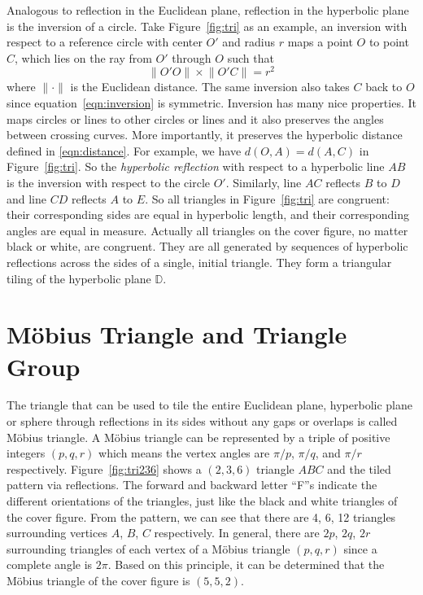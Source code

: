 \documentclass[12pt]{article}
\begin{document}
Analogous to reflection in the Euclidean plane, reflection in the
hyperbolic plane is the inversion of a circle. Take
Figure~\ref{fig:tri} as an example, an inversion with respect to a
reference circle with center $O'$ and radius $r$ maps a point $O$ to
point $C$, which lies on the ray from $O'$ through $O$ such that
\begin{equation}\label{eqn:inversion}
  \lVert O'O \rVert \times \lVert O'C \rVert= r^2
\end{equation}
where $\lVert \cdot \rVert$ is the Euclidean distance. The same
inversion also takes $C$ back to $O$ since
equation~\eqref{eqn:inversion} is symmetric. Inversion has many nice
properties. It maps circles or lines to other circles or lines and it
also preserves the angles between crossing curves. More importantly,
it preserves the hyperbolic distance defined in
\eqref{eqn:distance}. For example, we have $d(O, A)=d(A, C)$ in
Figure~\ref{fig:tri}. So the \emph{hyperbolic reflection} with respect
to a hyperbolic line $AB$ is the inversion with respect to the circle
$O'$. Similarly, line $AC$ reflects $B$ to $D$ and line $CD$ reflects
$A$ to $E$. So all triangles in Figure~\ref{fig:tri} are congruent:
their corresponding sides are equal in hyperbolic length, and their
corresponding angles are equal in measure. Actually all triangles on
the cover figure, no matter black or white, are congruent. They are
all generated by sequences of hyperbolic reflections across the sides
of a single, initial triangle. They form a triangular tiling of the
hyperbolic plane $\mathbb{D}$.

\section{M\"obius Triangle and Triangle Group}

The triangle that can be used to tile the entire Euclidean plane,
hyperbolic plane or sphere through reflections in its sides without
any gaps or overlaps is called M\"obius triangle. A M\"obius triangle
can be represented by a triple of positive integers $(p, q, r)$ which
means the vertex angles are $\pi/p$, $\pi/q$, and $\pi/r$
respectively. Figure~\ref{fig:tri236} shows a $(2, 3, 6)$ triangle
$ABC$ and the tiled pattern via reflections. The forward and backward
letter ``F''s indicate the different orientations of the triangles,
just like the black and white triangles of the cover figure. From the
pattern, we can see that there are 4, 6, 12 triangles surrounding
vertices $A$, $B$, $C$ respectively. In general, there are $2p$, $2q$,
$2r$ surrounding triangles of each vertex of a M\"obius triangle $(p,
q, r)$ since a complete angle is $2\pi$. Based on this principle, it
can be determined that the M\"obius triangle of the cover figure is
$(5, 5, 2)$.
\end{document}
